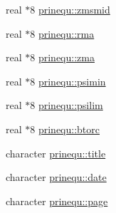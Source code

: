 \begin{CompactItemize}
real $\ast$8 \hyperlink{namespaceprinequ_60a29e973631324ed2ad950585ad50d4}{prinequ::zmsmid}
\item 
real $\ast$8 \hyperlink{namespaceprinequ_9baaf20a81d9b0570388ae03719ea32e}{prinequ::rma}
\item 
real $\ast$8 \hyperlink{namespaceprinequ_2eef48f5c40af1c24381aed32f643c19}{prinequ::zma}
\item 
real $\ast$8 \hyperlink{namespaceprinequ_5c8e4bf1504c7b93d7ff84932c976a15}{prinequ::psimin}
\item 
real $\ast$8 \hyperlink{namespaceprinequ_05b4c9c9a512ba7b68c5d65d9ce3b41b}{prinequ::psilim}
\item 
real $\ast$8 \hyperlink{namespaceprinequ_e10a61ae7e5b9a1d4e8995f3bf7a1a55}{prinequ::btorc}
\item 
character \hyperlink{namespaceprinequ_c547b01609416ef885762a15c771e7fa}{prinequ::title}
\item 
character \hyperlink{namespaceprinequ_0bf10630a1327bf8bcdec7ccc05aa19d}{prinequ::date}
\item 
character \hyperlink{namespaceprinequ_739dea1dcb841b3637127568990b1f19}{prinequ::page}
\end{CompactItemize}
